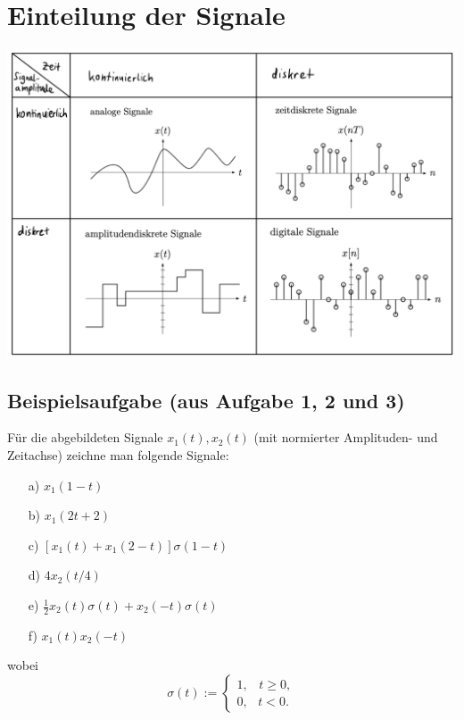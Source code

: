 \documentclass[11pt]{article}
\renewcommand{\thesection}{\arabic{section}}
\begin{document}
\setcounter{section}{1}
\renewcommand{\thesection}{1} %
\section{Einteilung der Signale}
\vspace*{-0.5cm}

\begin{center}
    \includegraphics[width=0.78\linewidth]{docimgs/Signale.jpg}
\end{center}

\vspace*{-1cm}
\subsection*{Beispielsaufgabe \textnormal{(aus Aufgabe 1, 2 und 3)}}
\vspace*{-0.5cm}
Für die abgebildeten Signale $x_1(t), x_2(t)$ (mit normierter Amplituden- und Zeitachse) zeichne man folgende Signale:

\begin{multicols}{2}
\begin{itemize}
    \item[a)] $x_1(1-t)$ 
    \item[b)] $x_1(2t+2)$
    \item[c)] $\left[x_1(t) + x_1(2-t) \right]\sigma(1-t)$
    \item[d)] $4x_2(t/4)$
    \item[e)] $\frac{1}{2}x_2(t)\sigma(t) + x_2(-t)\sigma(t)$
    \item[f)] $x_1(t)x_2(-t)$
\end{itemize}

\end{multicols}
\vspace*{-0.5cm}
wobei
$$\sigma(t) := \begin{cases}
    1, \hspace{10pt} t\geq 0, \\
    0, \hspace{9pt} t < 0.
\end{cases} $$
\end{document}
